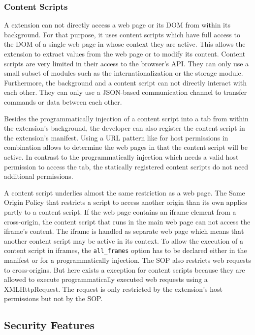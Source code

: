 \subsubsection{Content Scripts}
	
	A extension can not directly access a web page or its DOM from within its background. For that purpose, it uses content scripts which have full access to the DOM of a single web page in whose context they are active. This allows the extension to extract values from the web page or to modify its content. Content scripts are very limited in their access to the browser's API. They can only use a small subset of modules such as the internationalization or the storage module. Furthermore, the background and a content script can not directly interact with each other. They can only use a JSON-based communication channel to transfer commands or data between each other. 
	
	Besides the programmatically injection of a content script into a tab from within the extension's background, the developer can also register the content script in the extension's manifest. Using a URL pattern like for host permissions in combination allows to determine the web pages in that the content script will be active. In contrast to the programmatically injection which needs a valid host permission to access the tab, the statically registered content scripts do not need additional permissions. 
	
	A content script underlies almost the same restriction as a web page. The Same Origin Policy that restricts a script to access another origin than its own applies partly to a content script. If the web page contains an iframe element from a cross-origin, the content script that runs in the main web page can not access the iframe's content. The iframe is handled as separate web page which means that another content script may be active in its context. To allow the execution of a content script in iframes, the \texttt{all\_frames} option has to be declared either in the manifest or for a programmatically injection. The SOP also restricts web requests to cross-origins. But here exists a exception for content scripts because they are allowed to execute programmatically executed web requests using a XMLHttpRequest. The request is only restricted by the extension's host permissions but not by the SOP. 

\subsection{Security Features}

